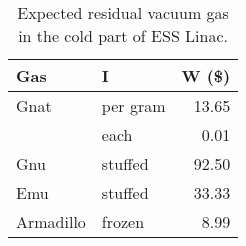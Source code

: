 \begin{table}[ht]
	\centering
	\caption[Expected residual vacuum gas in the cold part of ESS Linac]
	{Expected residual vacuum gas in the cold part of ESS Linac.}
	\label{}
	\begin{tabular}{llr}
		\toprule
		Gas       & I        & W (\$) \\
		\midrule
		Gnat      & per gram & 13.65  \\
		          & each     & 0.01   \\
		Gnu       & stuffed  & 92.50  \\
		Emu       & stuffed  & 33.33  \\
		Armadillo & frozen   & 8.99   \\
		\bottomrule
	\end{tabular}
\end{table}